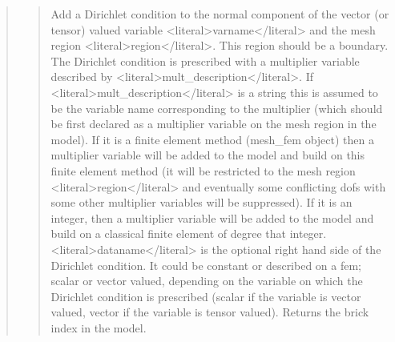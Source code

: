 \documentclass[a4paper,11pt,english]{sphinxmanual}
\begin{document}
\begin{quote}
\sphinxAtStartPar
{}
\begin{quote}

\sphinxAtStartPar
Add a Dirichlet condition to the normal component of the vector
(or tensor) valued variable \textless{}literal\textgreater{}varname\textless{}/literal\textgreater{} and the mesh
region \textless{}literal\textgreater{}region\textless{}/literal\textgreater{}. This region should be a boundary. The Dirichlet
condition is prescribed with a multiplier variable described by
\textless{}literal\textgreater{}mult\_description\textless{}/literal\textgreater{}. If \textless{}literal\textgreater{}mult\_description\textless{}/literal\textgreater{} is a string this is assumed
to be the variable name corresponding to the multiplier (which should be
first declared as a multiplier variable on the mesh region in the model).
If it is a finite element method (mesh\_fem object) then a multiplier
variable will be added to the model and build on this finite element
method (it will be restricted to the mesh region \textless{}literal\textgreater{}region\textless{}/literal\textgreater{} and eventually
some conflicting dofs with some other multiplier variables will be
suppressed). If it is an integer, then a  multiplier variable will be
added to the model and build on a classical finite element of degree
that integer. \textless{}literal\textgreater{}dataname\textless{}/literal\textgreater{} is the optional right hand side of  the
Dirichlet condition. It could be constant or described on a fem; scalar
or vector valued, depending on the variable on which the Dirichlet
condition is prescribed (scalar if the variable
is vector valued, vector if the variable is tensor valued).
Returns the brick index in the model.
\end{quote}

\sphinxAtStartPar
{}
\begin{quote}


\end{quote}
\end{quote}
\end{document}
